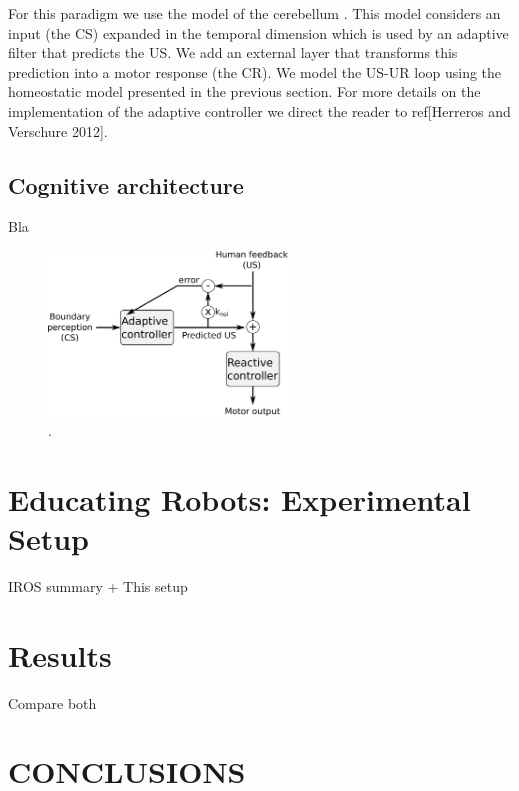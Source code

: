 \documentclass[letterpaper, 10 pt, conference]{ieeeconf}  %
\begin{document}
For this paradigm we use the model of the cerebellum \cite{herreros2013nucleo}. This model considers an input (the CS) expanded in the temporal dimension which is used by an adaptive filter that predicts the US. We add an external layer that transforms this prediction into a motor response (the CR). We model the US-UR loop using the homeostatic model presented in the previous section. For more details on the implementation of the adaptive controller we direct the reader to ref[Herreros and Verschure 2012]. 

\subsection{Cognitive architecture}

Bla

\begin{figure}[!t]
\centering
\includegraphics[width=2.5in]{architecture}
\caption{.}
\label{fig:architecture}
\end{figure}


\section{Educating Robots: Experimental Setup}
\label{sec:setup}
IROS summary + This setup

\section{Results}
\label{sec:results}
Compare both

\section{CONCLUSIONS}
\label{sec:conclusions}
\end{document}
